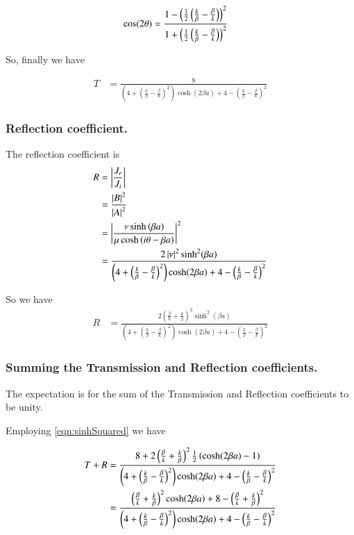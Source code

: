 \documentclass{article}
\begin{document}
\begin{align*}
\cos(2\theta) 
&= 
\frac{ 1 - \left(\frac{1}{2} \left(\frac{k}{\beta} - \frac{\beta}{k} \right)\right)^2 }
{1 + \left(\frac{1}{2} \left(\frac{k}{\beta} - \frac{\beta}{k} \right)\right)^2}
\end{align*}

So, finally we have

\begin{align}\label{eqn:Tcoeff1}
T 
&= \frac{8} { 
\left(4 + \left( \frac{k}{\beta} -\frac{\beta}{k} \right)^2 \right)
\cosh(2\beta a)
+ 
4 - \left(\frac{k}{\beta} - \frac{\beta}{k} \right)^2 
}
\end{align}

\subsubsection{ Reflection coefficient. }

The reflection coefficient is
\begin{align*}
R 
&= \left\lvert{\frac{J_r}{J_i}}\right\rvert \\
&= \frac{\left\lvert{B}\right\rvert^2}{\left\lvert{A}\right\rvert^2} \\
&= 
\left\lvert{\frac{\nu \sinh\left( \beta a \right) }
{\mu \cosh\left( i\theta -\beta a \right) }}\right\rvert^2 \\
&= \frac{2 \left\lvert{\nu}\right\rvert^2 \sinh^2( \beta a)} { 
\left(4 + \left( \frac{k}{\beta} -\frac{\beta}{k} \right)^2 \right)
\cosh(2\beta a)
+ 
4 - \left(\frac{k}{\beta} - \frac{\beta}{k} \right)^2 
}
\end{align*}

So we have
\begin{align}\label{eqn:Rcoeff1}
R 
&= \frac{2 
\left(\frac{\beta}{k} + \frac{k}{\beta} \right)^2 
\sinh^2( \beta a)} { 
\left(4 + \left( \frac{k}{\beta} -\frac{\beta}{k} \right)^2 \right)
\cosh(2\beta a)
+ 
4 - \left(\frac{k}{\beta} - \frac{\beta}{k} \right)^2 
}
\end{align}

\subsubsection{ Summing the Transmission and Reflection coefficients. }

The expectation is for the 
sum of the Transmission and Reflection coefficients to be unity.

Employing \ref{eqn:sinhSquared} we have

\begin{align*}
T + R 
&= \frac{8 + 2 
\left(\frac{\beta}{k} + \frac{k}{\beta} \right)^2 
\frac{1}{2} \left( \cosh(2 \beta a) -1 \right) 
} { 
\left(4 + \left( \frac{k}{\beta} -\frac{\beta}{k} \right)^2 \right)
\cosh(2\beta a)
+ 
4 - \left(\frac{k}{\beta} - \frac{\beta}{k} \right)^2 
} \\
&= \frac{ 
\left(\frac{\beta}{k} + \frac{k}{\beta} \right)^2 
\cosh(2 \beta a) + 8 - \left(\frac{\beta}{k} + \frac{k}{\beta} \right)^2 
} { 
\left(4 + \left( \frac{k}{\beta} -\frac{\beta}{k} \right)^2 \right)
\cosh(2\beta a)
+ 
4 - \left(\frac{k}{\beta} - \frac{\beta}{k} \right)^2 
} \\
\end{align*}
\end{document}
